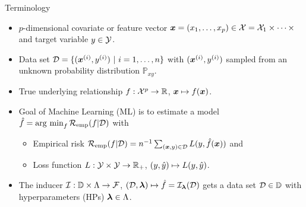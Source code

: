 \documentclass[t,10pt]{beamer}
\begin{document}
\begin{frame}{Terminology}
  \begin{itemize}

    \item
      $p$-dimensional covariate or feature vector $\bm{x} = (x_1, \dots, x_p) \in \mathcal{X} =  \mathcal{X}_1 \times \cdots\times$ and target variable $y\in\mathcal{Y}$.

    \item
      Data set $\mathcal{D} = \{(\bm{x}^{(i)}, y^{(i)})\ |\ i = 1, \dots, n\}$ with $(\bm{x}^{(i)}, y^{(i)})$ sampled from an unknown probability distribution $\mathbb{P}_{xy}$.

    \item
      True underlying relationship $f : \mathcal{X}^p \to \mathbb{R}$, $\bm{x} \mapsto f(\bm{x})$.

    \item
      Goal of Machine Learning (ML) is to estimate a model $\hat{f} = \operatorname{arg~min}_{f} \mathcal{R}_{\text{emp}}(f | \mathcal{D})$ with
      \begin{itemize}
        \item Empirical risk $\mathcal{R}_{\text{emp}}(f | \mathcal{D}) = n^{-1} \sum_{(\bm{x}, y)\in\mathcal{D}} L(y, \hat{f}(\bm{x}))$ and
        \item Loss function $L : \mathcal{Y}\times\mathcal{Y} \to \mathbb{R}_+$, $(y,\hat{y}) \mapsto L(y,\hat{y})$.
      \end{itemize}

    \item
      The inducer $\mathcal{I} : \mathbb{D} \times \Lambda \to \mathcal{F}$, $(\mathcal{D}, \bm{\lambda}) \mapsto \hat{f}=\mathcal{I}_{\bm{\lambda}}(\mathcal{D})$ gets a data set $\mathcal{D}\in\mathbb{D}$ with hyperparameters (HPs) $\bm{\lambda}\in\Lambda$.

  \end{itemize}
\end{frame}
\end{document}
